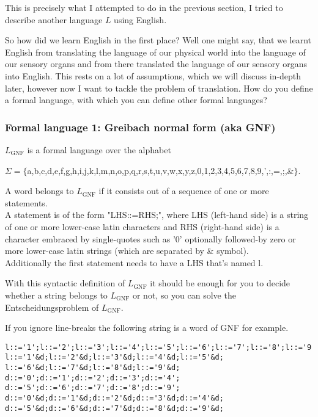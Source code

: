 This is precisely what I attempted to do in the previous section, I tried to describe another language $L$ using English.

So how did we learn English in the first place? Well one might say, that we learnt English from translating the language of our physical world into the language of our sensory organs and from there translated the language of our sensory organs into English. This rests on a lot of assumptions, which we will discuss in-depth later, however now I want to tackle the problem of translation. How do you define a formal language, with which you can define other formal languages? 

\subsubsection{Formal language 1: Greibach normal form (aka GNF)}
$L_{\text{GNF}}$ is a formal language over the alphabet

$\Sigma = \{$a,b,c,d,e,f,g,h,i,j,k,l,m,n,o,p,q,r,s,t,u,v,w,x,y,z,0,1,2,3,4,5,6,7,8,9,',:,=,;,\&$\}$. 


\noindent
A word belongs to $L_{\text{GNF}}$ if it consists out of a sequence of one or more statements. \\
A statement is of the form "LHS::=RHS;", where LHS (left-hand side) is a string of one or more lower-case latin characters and RHS (right-hand side) is a character embraced by single-quotes such as '0' optionally followed-by zero or more lower-case latin strings (which are separated by \& symbol). \\
Additionally the first statement needs to have a LHS that's named l.

\noindent

With this syntactic definition of $L_{\text{GNF}}$ it should be enough for you to decide whether a string belongs to $L_{\text{GNF}}$ or not, so you can solve the Entscheidungsproblem of $L_{\text{GNF}}$.

If you ignore line-breaks the following string is a word of GNF for example.
\begin{lstlisting}
l::='1';l::='2';l::='3';l::='4';l::='5';l::='6';l::='7';l::='8';l::='9';  
l::='1'&d;l::='2'&d;l::='3'&d;l::='4'&d;l::='5'&d;
l::='6'&d;l::='7'&d;l::='8'&d;l::='9'&d;
d::='0';d::='1';d::='2';d::='3';d::='4';
d::='5';d::='6';d::='7';d::='8';d::='9';  
d::='0'&d;d::='1'&d;d::='2'&d;d::='3'&d;d::='4'&d;
d::='5'&d;d::='6'&d;d::='7'&d;d::='8'&d;d::='9'&d;  
\end{lstlisting}


